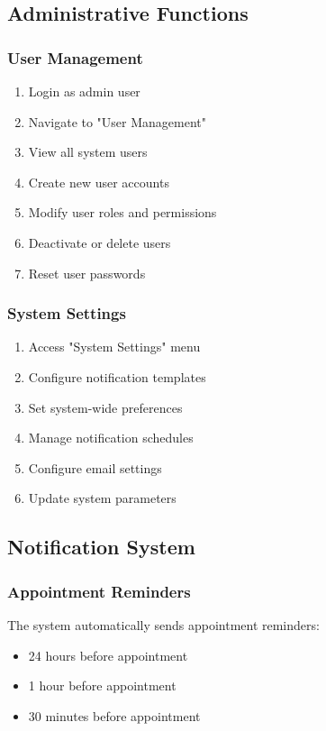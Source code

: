 \documentclass[12pt,a4paper]{article}
\begin{document}
\subsection{Administrative Functions}

\subsubsection{User Management}

\begin{enumerate}
    \item Login as admin user
    \item Navigate to "User Management"
    \item View all system users
    \item Create new user accounts
    \item Modify user roles and permissions
    \item Deactivate or delete users
    \item Reset user passwords
\end{enumerate}

\subsubsection{System Settings}

\begin{enumerate}
    \item Access "System Settings" menu
    \item Configure notification templates
    \item Set system-wide preferences
    \item Manage notification schedules
    \item Configure email settings
    \item Update system parameters
\end{enumerate}

\subsection{Notification System}

\subsubsection{Appointment Reminders}

The system automatically sends appointment reminders:
\begin{itemize}
    \item 24 hours before appointment
    \item 1 hour before appointment
    \item 30 minutes before appointment
\end{itemize}
\end{document}
